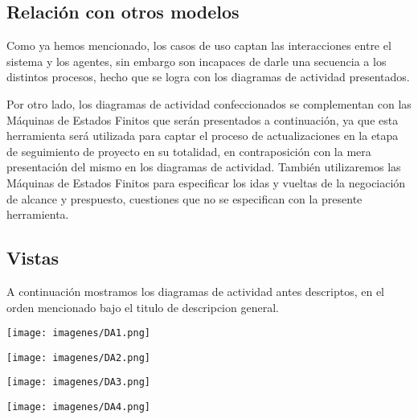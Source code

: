 \subsection{Relación con otros modelos}
Como ya hemos mencionado, los casos de uso captan las interacciones entre el sistema y los agentes, sin embargo son incapaces de darle una secuencia a los distintos procesos, hecho que se logra con los diagramas de actividad presentados.

Por otro lado, los diagramas de actividad confeccionados se complementan con las Máquinas de Estados Finitos que serán presentados a continuación, ya que esta herramienta será utilizada para captar el proceso de actualizaciones en la etapa de seguimiento de proyecto en su totalidad, en contraposición con la mera presentación del mismo en los diagramas de actividad. También utilizaremos las Máquinas de Estados Finitos para especificar los idas y vueltas de la negociación de alcance y prespuesto, cuestiones que no se especifican con la presente herramienta.

\newpage
\subsection{Vistas}
A continuación mostramos los diagramas de actividad antes descriptos, en el orden mencionado bajo el titulo de descripcion general.

\begin{center}
\texttt{[image: imagenes/DA1.png]}
\end{center}

\newpage

\begin{center}
\texttt{[image: imagenes/DA2.png]}
\end{center}

\newpage

\begin{center}
\texttt{[image: imagenes/DA3.png]}
\end{center}

\newpage

\begin{center}
\texttt{[image: imagenes/DA4.png]}
\end{center}
